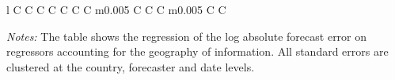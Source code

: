 \begin{table}[H]
{\begin{tabularx}{\linewidth}{l C C C C C C C m{0.005\textwidth} C C C m{0.005\textwidth} C C}
\end{tabularx}
\begin{flushleft}
\footnotesize \begin{minipage}{1\linewidth} \vspace{-10pt} \begin{tabnote} \textit{Notes:}   The table shows the regression of the log absolute forecast error on regressors accounting for the geography of information. All standard errors are clustered at the country, forecaster and date levels. \end{tabnote} \end{minipage}  
\end{flushleft}
}
\end{table}
